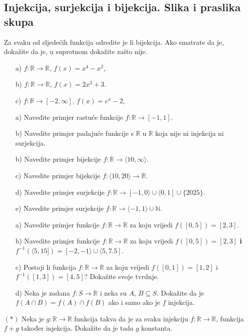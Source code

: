 \subsection*{Injekcija, surjekcija i bijekcija. Slika i praslika skupa}
\begin{exercise}
Za svaku od sljedećih funkcija odredite je li bijekcija. Ako smatrate da je, dokažite da je, u suprotnom dokažite zašto nije.
\begin{itemize}
\item[a)] $f : \mathbb{R}\to \mathbb{R}$, $f(x)=x^4-x^2$,
\item[b)] $f : \mathbb{R}\to \mathbb{R}$, $f(x)=2x^3+3$.
\item[c)] $f : \mathbb{R}\to [-2, \infty]$, $f(x)=e^x-2$,
\end{itemize}
\end{exercise}
\begin{exercise} \textbf{}
\begin{itemize}
\item[a)] Navedite primjer rastuće funkcije $f : \mathbb{R}\to [-1, 1]$.
\item[b)] Navedite primjer padajuće funkcije s $\mathbb{R}$ u $\mathbb{R}$ koja nije ni injekcija ni surjekcija.
\item[b)] Navedite primjer bijekcije $f : \mathbb{R}\to \langle 10, \infty\rangle$.
\item[c)] Navedite primjer bijekcije $f : \langle 10, 20\rangle\to \mathbb{R}$.
\item[d)] Navedite primjer surjekcije $f : \mathbb{R}\to [-1, 0\rangle\cup \langle 0, 1]\cup \{2025\}$.
\item[e)] Navedite primjer surjekcije $f : \mathbb{R}\to \langle -1, 1\rangle \cup \mathbb{N}$.
\end{itemize}
\end{exercise}
\begin{exercise} \textbf{}
\begin{itemize}
\item[a)] Navedite primjer funkcije $f : \mathbb{R}\to \mathbb{R}$ za koju vrijedi $f([0, 5])=[2, 3]$.
\item[b)] Navedite primjer funkcije $f : \mathbb{R}\to \mathbb{R}$ za koju vrijedi $f([0, 5])=[2, 3]$ \textbf{i} $f^{-1}\left(\langle 5, 15]\right)=[-2, -1\rangle \cup \langle 5, 7.5]$.
\item[c)] Postoji li funkcija $f : \mathbb{R}\to \mathbb{R}$ za koju vrijedi $f\left([0, 1]\right)=[1, 2]$ i $f^{-1}\left([1, 3]\right)=[4, 5]$? Dokažite svoje tvrdnje.
\item[d)] Neka je zadana $f : S\to \mathbb{R}$ i neka su $A$, $B\subseteq S$. Dokažite da je $f(A\cap B)=f(A)\cap f(B)$ ako i samo ako je $f$ injekcija.
\end{itemize}
\end{exercise}
\begin{exercise} $(*)$ Neka je $g : \mathbb{R}\to \mathbb{R}$ funkcija takva da je za svaku injekciju $f : \mathbb{R}\to \mathbb{R}$, funkcija $f+g$ također injekcija. Dokažite da je tada $g$ konstanta.
\end{exercise}
